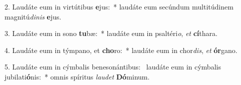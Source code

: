 2. Laudáte eum in virtútibus \textbf{e}jus:~*  laudáte eum secúndum multitúdinem magnitú\textit{di}\textit{nis} \textbf{e}jus.\

3. Laudáte eum in sono \textbf{tu}bæ:~*  laudáte eum in psaltéri\textit{o}, \textit{et} \textbf{cí}thara.\

4. Laudáte eum in týmpano, et \textbf{cho}ro:~*  laudáte eum in chor\textit{dis}, \textit{et} \textbf{ór}gano.\

5. Laudáte eum in cýmbalis benesonántibus: \dag\  laudáte eum in cýmbalis jubilati\textbf{ó}nis:~*  omnis spíritus \textit{lau}\textit{det} \textbf{Dó}minum.\

